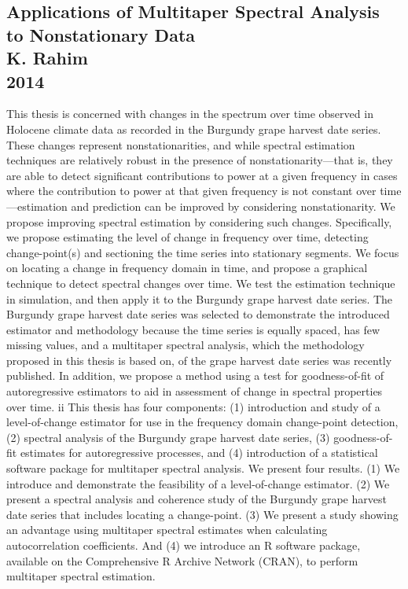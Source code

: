 \documentclass{article}
\begin{document}
\subsection{Applications of Multitaper Spectral Analysis to Nonstationary Data \\
K. Rahim \\
2014}
This thesis is concerned with changes in the spectrum over time observed in Holocene climate data as recorded in the Burgundy grape harvest date series. These changes represent nonstationarities, and while spectral estimation techniques are relatively robust in the presence of nonstationarity—that is, they are able to detect significant contributions to power at a given frequency in cases where the contribution to power at that given frequency is not constant over time—estimation and prediction can be improved by considering nonstationarity. We propose improving spectral estimation by considering such changes. Specifically, we propose estimating the level of change in frequency over time, detecting change-point(s) and sectioning the time series into stationary segments. We focus on locating a change in frequency domain in time, and propose a graphical technique to detect spectral changes over time. We test the estimation technique in simulation, and then apply it to the Burgundy grape harvest date series. The Burgundy grape harvest date series was selected to demonstrate the introduced estimator and methodology because the time series is equally spaced, has few missing values, and a multitaper spectral analysis, which the methodology proposed in this thesis is based on, of the grape harvest date series was recently published. In addition, we propose a method using a test for goodness-of-fit of autoregressive estimators to aid in assessment of change in spectral properties over time. ii This thesis has four components: (1) introduction and study of a level-of-change estimator for use in the frequency domain change-point detection, (2) spectral analysis of the Burgundy grape harvest date series, (3) goodness-of-fit estimates for autoregressive processes, and (4) introduction of a statistical software package for multitaper spectral analysis. We present four results. (1) We introduce and demonstrate the feasibility of a level-of-change estimator. (2) We present a spectral analysis and coherence study of the Burgundy grape harvest date series that includes locating a change-point. (3) We present a study showing an advantage using multitaper spectral estimates when calculating autocorrelation coefficients. And (4) we introduce an R software package, available on the Comprehensive R Archive Network (CRAN), to perform multitaper spectral estimation. \\
\end{document}
